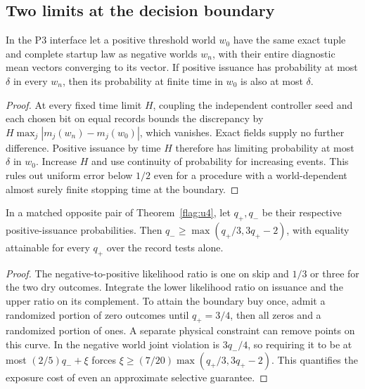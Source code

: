\subsection{Two limits at the decision boundary}
\begin{lemma}\label{flag:continuity}
In the P3 interface let a positive threshold world \(w_0\) have the same exact tuple and complete startup law as negative worlds \(w_n\), with their entire diagnostic mean vectors converging to its vector. If positive issuance has probability at most \(\delta\) in every \(w_n\), then its probability at finite time in \(w_0\) is also at most \(\delta\).
\end{lemma}
\begin{proof}
At every fixed time limit \(H\), coupling the independent controller seed and each chosen bit on equal records bounds the discrepancy by \(H\max_j|m_j(w_n)-m_j(w_0)|\), which vanishes. Exact fields supply no further difference. Positive issuance by time \(H\) therefore has limiting probability at most \(\delta\) in \(w_0\). Increase \(H\) and use continuity of probability for increasing events. This rules out uniform error below \(1/2\) even for a procedure with a world-dependent almost surely finite stopping time at the boundary.
\end{proof}
\begin{lemma}\label{flag:roc}
In a matched opposite pair of Theorem~\ref{flag:u4}, let \(q_+,q_-\) be their respective positive-issuance probabilities. Then \(q_-\ge\max(q_+/3,3q_+-2)\), with equality attainable for every \(q_+\) over the record tests alone.
\end{lemma}
\begin{proof}
The negative-to-positive likelihood ratio is one on skip and \(1/3\) or three for the two dry outcomes. Integrate the lower likelihood ratio on issuance and the upper ratio on its complement. To attain the boundary buy once, admit a randomized portion of zero outcomes until \(q_+=3/4\), then all zeros and a randomized portion of ones. A separate physical constraint can remove points on this curve. In the negative world joint violation is \(3q_-/4\), so requiring it to be at most \((2/5)q_-+\xi\) forces \(\xi\ge(7/20)\max(q_+/3,3q_+-2)\). This quantifies the exposure cost of even an approximate selective guarantee.
\end{proof}
